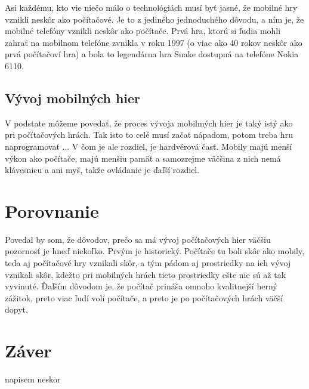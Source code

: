 \documentclass[10pt,twoside,slovak,a4paper]{article}
\begin{document}
Asi každému, kto vie niečo málo o technológiách musí byť jasné, že mobilné hry vznikli neskôr ako počítačové. Je to z jediného jednoduchého dôvodu, a ním je, že mobilné telefóny vznikli neskôr ako počítače. Prvá hra, ktorú si ľudia mohli zahrať na mobilnom telefóne zvnikla v roku 1997 (o viac ako 40 rokov neskôr ako prvá počítačoví hra) a bola to legendárna hra Snake dostupná na telefóne Nokia 6110.~\cite{2}

\subsection{Vývoj mobilných hier}
V podstate môžeme povedať, že proces vývoja mobilmých hier je taký istý ako pri počítačových hrách. Tak isto to celé musí začať nápadom, potom treba hru naprogramovať ... V čom je ale rozdiel, je hardvérová časť. Mobily majú menší výkon ako počítače, majú menšiu pamäť a samozrejme väčšina z nich nemá klávesnicu a ani myš, takže ovládanie je ďaľší rozdiel.

\section{Porovnanie} \label{dolezita}

Povedal by som, že dôvodov, prečo sa má vývoj počítačových hier väčšiu pozornosť je hneď niekoľko. Prvým je historický. Počítače tu boli skôr ako mobily, teda aj počítačové hry vznikali skôr, a tým pádom aj prostriedky na ich vývoj vznikali skôr, kdežto pri mobilných hrách tieto prostriedky ešte nie sú až tak vyvinuté. Ďaľším dôvodom je, že počítač prináša omnoho kvalitnejší herný zážitok, preto viac ľudí volí počítače, a preto je po počítačových hrách väčší dopyt.

\section{Záver}
napisem neskor


\end{document}
